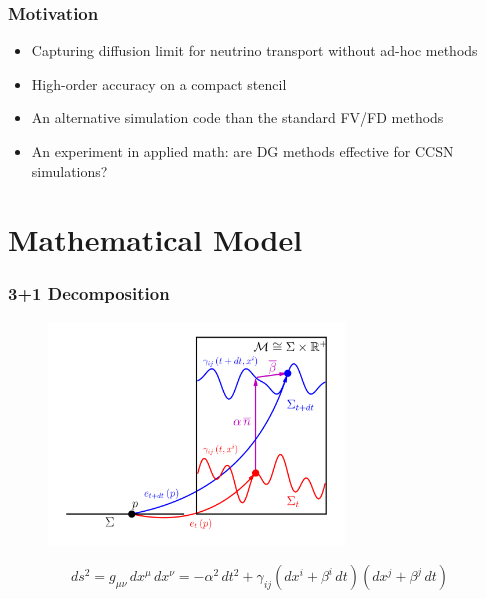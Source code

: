 \documentclass{beamer}
\begin{document}
\begin{frame}
\frametitle{Motivation}

  \begin{itemize}
    \item
      Capturing diffusion limit for neutrino transport without
      ad-hoc methods
    \item
      High-order accuracy on a compact stencil
    \item
      An alternative simulation code than the standard FV/FD methods
    \item
      An experiment in applied math:
      are DG methods effective for CCSN simulations?
  \end{itemize}

\end{frame}

\section{Mathematical Model}

\begin{frame}
\frametitle{3+1 Decomposition}

  \begin{figure}[htb!]
    \centering
    \includegraphics[width=0.7\textwidth]{fig.1p1.png}
  \end{figure}

  \vspace{-2em}

  \begin{equation*}
    ds^{2}
    =g_{\mu\nu}\,dx^{\mu}\,dx^{\nu}
    =-\alpha^{2}\,dt^{2}
     +\gamma_{ij}\left(dx^{i}+\beta^{i}\,dt\right)
                 \left(dx^{j}+\beta^{j}\,dt\right)
  \end{equation*}

\end{frame}
\end{document}
